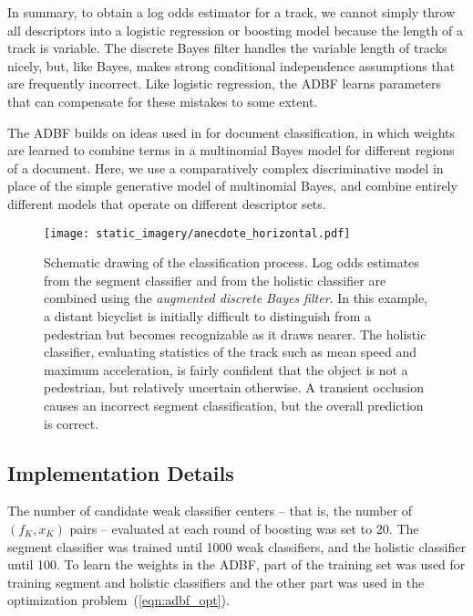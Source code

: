 \documentclass[letterpaper, 10 pt, conference]{ieeeconf}  %
\begin{document}
In summary, to obtain a log odds estimator for a track, we cannot simply throw all descriptors into a logistic regression or boosting model because the length of a track is variable.  The discrete Bayes filter handles the variable length of tracks nicely, but, like \naive Bayes, makes strong conditional independence assumptions that are frequently incorrect.  Like logistic regression, the ADBF learns parameters that can compensate for these mistakes to some extent.

The ADBF builds on ideas used in \cite{Raina2004} for document classification, in which weights are learned to combine terms in a multinomial \naive Bayes model for different regions of a document.  Here, we use a comparatively complex discriminative model in place of the simple generative model of multinomial \naive Bayes, and combine entirely different models that operate on different descriptor sets.

\begin{figure*}
  \centering
  \texttt{[image: static\_imagery/anecdote\_horizontal.pdf]}
  \caption{Schematic drawing of the classification process.  Log odds estimates from the segment classifier and from the holistic classifier are combined using the \textit{augmented discrete Bayes filter}.  In this example, a distant bicyclist is initially difficult to distinguish from a pedestrian but becomes recognizable as it draws nearer.  The holistic classifier, evaluating statistics of the track such as mean speed and maximum acceleration, is fairly confident that the object is not a pedestrian, but relatively uncertain otherwise.  A transient occlusion causes an incorrect segment classification, but the overall prediction is correct.}
  \label{fig:anecdote}
\end{figure*}


\subsection{Implementation Details}

The number of candidate weak classifier centers -- that is, the number of $(f_K, x_K)$ pairs -- evaluated at each round of boosting was set to 20.  The segment classifier was trained until 1000 weak classifiers, and the holistic classifier until 100.  To learn the weights in the ADBF, part of the training set was used for training segment and holistic classifiers and the other part was used in the optimization problem~(\ref{eqn:adbf_opt}).
\end{document}
